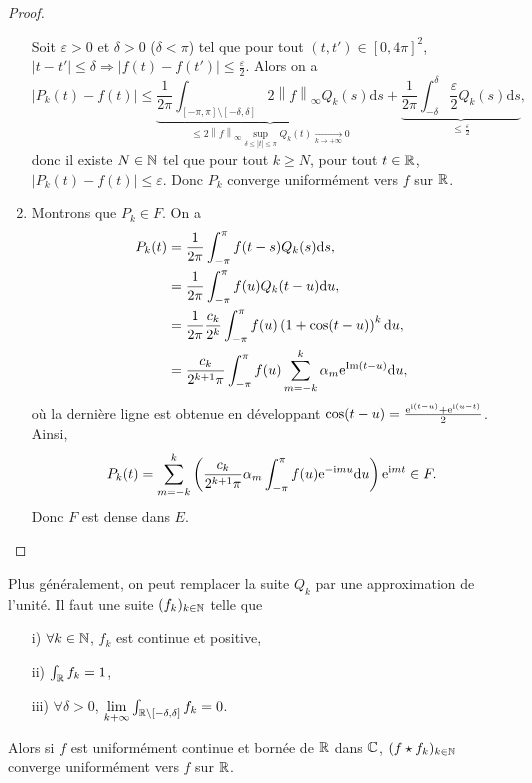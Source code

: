 \documentclass[12pt]{article}
\begin{document}
\begin{proof}
\begin{enumerate}
        Soit $\varepsilon>0$ et $\delta>0$ ($\delta<\pi$) tel que pour tout $(t,t')\in[0,4\pi]^{2}$, $\left\lvert t-t'\right\rvert\leqslant\delta\Rightarrow\left\lvert f(t)-f(t')\right\rvert\leqslant\frac{\varepsilon}{2}$. Alors on a 
        \begin{equation}
            \left\lvert P_{k}(t)-f(t)\right\rvert\leqslant\underbrace{\frac{1}{2\pi}\int_{[-\pi,\pi]\setminus[-\delta,\delta]}2\left\lVert f\right\rVert_{\infty}Q_{k}(s)\mathrm{d}s}_{\leqslant2\left\lVert f\right\rVert_{\infty}\sup\limits_{\delta\leqslant\left\lvert t\right\rvert \leqslant\pi}Q_{k}(t)\xrightarrow[k\to+\infty]{}0}+\underbrace{\frac{1}{2\pi}\int_{-\delta}^{\delta}\frac{\varepsilon}{2}Q_{k}(s)\mathrm{d}s}_{\leqslant\frac{\varepsilon}{2}},
        \end{equation}
        donc il existe $N\in\mathbb{N}$ tel que pour tout $k\geqslant N$, pour tout $t\in\mathbb{R}$, $\left\lvert P_{k}(t)-f(t)\right\rvert\leqslant\varepsilon$. Donc $P_{k}$ converge uniformément vers $f$ sur $\mathbb{R}$.

        \item Montrons que $P_{k}\in F$. On a 
        \begin{align}
            P_{k}(t)
            &=\frac{1}{2\pi}\int_{-\pi}^{\pi}f(t-s)Q_{k}(s)\mathrm{d}s,\\
            &=\frac{1}{2\pi}\int_{-\pi}^{\pi}f(u)Q_{k}(t-u)\mathrm{d}u,\\
            &=\frac{1}{2\pi}\frac{c_{k}}{2^{k}}\int_{-\pi}^{\pi}f(u)\left(1+\cos(t-u)\right)^{k}\mathrm{d}u,\\
            &=\frac{c_{k}}{2^{k+1}\pi}\int_{-\pi}^{\pi}f(u)\sum_{m=-k}^{k}\alpha_{m}\mathrm{e}^{\mathrm{Im}(t-u)}\mathrm{d}u,
        \end{align}
        où la dernière ligne est obtenue en développant $\cos(t-u)=\frac{\mathrm{e}^{\mathrm{i}(t-u)}+\mathrm{e}^{\mathrm{i}(u-t)}}{2}$.
        Ainsi, 
        \begin{equation}
            P_{k}(t)=\sum_{m=-k}^{k}\left(\frac{c_{k}}{2^{k+1}\pi}\alpha_{m}\int_{-\pi}^{\pi}f(u)\mathrm{e}^{-\mathrm{i} mu}\mathrm{d}u\right)\mathrm{e}^{\mathrm{i} mt}\in F.
        \end{equation}
        Donc $F$ est dense dans $E$.
    \end{enumerate}
\end{proof}

\begin{remark}
    Plus généralement, on peut remplacer la suite $Q_{k}$ par une \og approximation de l'unité\fg. Il faut une suite $(f_{k})_{k\in\mathbb{N}}$ telle que
    \begin{enumerate}
        \item [i)] $\forall k\in\mathbb{N}$, $f_{k}$ est continue et positive,
        \item [ii)] $\int_{\mathbb{R}}f_{k}=1$,
        \item [iii)] $\forall\delta >0$, $\lim\limits_{k+\infty}\int_{\mathbb{R}\setminus[-\delta,\delta]}f_{k}=0$.
    \end{enumerate}
    Alors si $f$ est uniformément continue et bornée de $\mathbb{R}$ dans $\mathbb{C}$, $(f\star f_{k})_{k\in\mathbb{N}}$ converge uniformément vers $f$ sur $\mathbb{R}$.
\end{remark}
\end{document}
